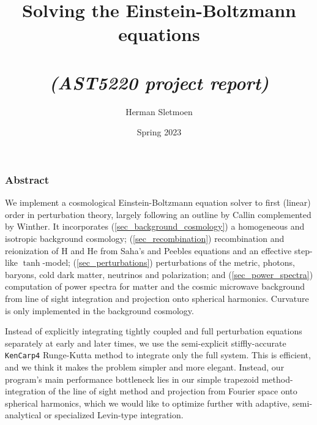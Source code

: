\documentclass[10pt,a4paper]{article}
\begin{document}
\title{\textbf{Solving the Einstein-Boltzmann equations}\\ \\\normalsize\textit{(AST5220 project report)}}
\author{Herman Sletmoen}

\date{Spring 2023}

\iffalse
\abstract
{Solve Einstein-Boltzmann equations}
{Solve Einstein-Boltzmann equations}
{Solve Einstein-Boltzmann equations}
{Solve Einstein-Boltzmann equations}
{Solve Einstein-Boltzmann equations}
\fi


\maketitle

\subsubsection*{\centering Abstract}
	We implement a cosmological Einstein-Boltzmann equation solver to first (linear) order in perturbation theory,
	largely following an outline by Callin complemented by Winther.
	It incorporates
	(\ref{sec_background_cosmology}) a homogeneous and isotropic background cosmology;
	(\ref{sec_recombination}) recombination and reionization of H and He from Saha's and Peebles equations and an effective step-like $\tanh$-model;
	(\ref{sec_perturbations}) perturbations of the metric, photons, baryons, cold dark matter, neutrinos and polarization; and
	(\ref{sec_power_spectra}) computation of power spectra for matter and the cosmic microwave background from line of sight integration and projection onto spherical harmonics.
	Curvature is only implemented in the background cosmology.

	Instead of explicitly integrating tightly coupled and full perturbation equations separately at early and later times,
	we use the semi-explicit stiffly-accurate \texttt{KenCarp4} Runge-Kutta method to integrate only the full system.
	This is efficient, and we think it makes the problem simpler and more elegant.
	Instead, our program's main performance bottleneck lies in our simple trapezoid method-integration
	of the line of sight method and projection from Fourier space onto spherical harmonics,
	which we would like to optimize further with adaptive, semi-analytical or specialized Levin-type integration.
\end{document}

